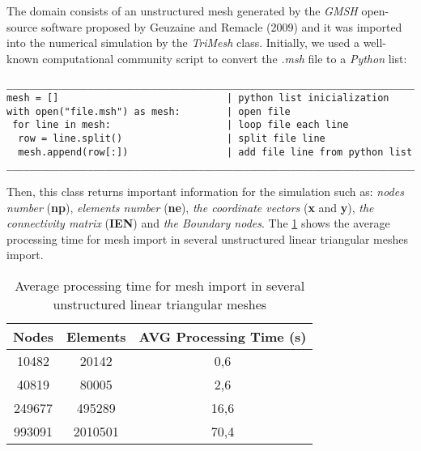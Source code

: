 The domain consists of an unstructured mesh generated by 
the \textit{GMSH} open-source software proposed by 
Geuzaine and Remacle (2009) \cite{gmsh} and 
it was imported into the numerical simulation by 
the \textit{TriMesh} class. 
Initially, we used a well-known computational community script to 
convert the \textit{.msh} file to a 
\textit{Python} list:

\begin{verbatim}
__________________________________________________________________________
mesh = []                             | python list inicialization
with open("file.msh") as mesh:        | open file 
 for line in mesh:                    | loop file each line
  row = line.split()                  | split file line
  mesh.append(row[:])                 | add file line from python list 
__________________________________________________________________________
\end{verbatim}

\noindent
Then, this class returns important information for the simulation 
such as:
\textit{nodes number} (\textbf{np}), 
\textit{elements number} (\textbf{ne}), 
\textit{the coordinate vectors} (\textbf{x} and \textbf{y}), 
\textit{the connectivity matrix} (\textbf{IEN}) and 
\textit{the Boundary nodes}. 
The \ref{tempo malha} shows the average processing time for 
mesh import in several unstructured linear triangular meshes import.

\vspace{0.5cm}
\begin{table}[H]
\centering
\begin{tabular}{ccc}
\toprule
\textbf{Nodes} & \textbf{Elements} & \textbf{AVG Processing Time} (s) \\
\midrule
10482 & 20142 & 0,6 \\
40819 & 80005 & 2,6 \\
249677 & 495289 & 16,6 \\
993091 & 2010501 & 70,4 \\
\bottomrule
\end{tabular}
\caption{Average processing time for mesh import in several unstructured linear triangular meshes}
\label{tempo malha}
\end{table}

\newpage
